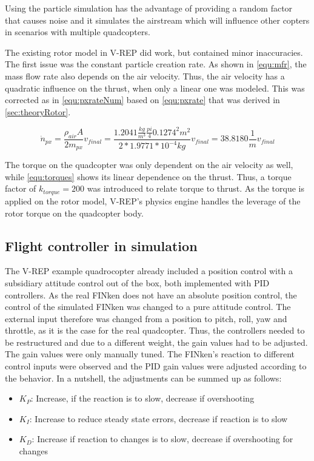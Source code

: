 Using the particle simulation has the advantage of providing a  random factor that causes noise and it simulates the airstream which will influence other copters in scenarios with multiple quadcopters.

The existing rotor model in V-REP did work, but contained minor inaccuracies. 
The first issue was the constant particle creation rate. As shown in \ref{equ:mfr}, the mass flow rate also depends on the air velocity. Thus, the air velocity has a quadratic influence on the thrust, when only a linear one was modeled. 
This was corrected as in \ref{equ:pxrateNum} based on  \ref{equ:pxrate} that was derived in \ref{sec:theoryRotor}.

  \begin{equation}
    \dot n_{px} = \frac{\rho_{air} A}{2m_{px}} v_{final} = \frac{1.2041 \frac{kg}{m^3} \frac{pi}{4} 0.1274^2 m^2}{2 * 1.9771 * 10^{-4} kg} v_{final} = 38.8180 \frac{1}{m}v_{final}
    \label{equ:pxrateNum}
    \end{equation}
    
   The torque on the quadcopter was only dependent on the air velocity as well, while \ref{equ:torques} shows its linear dependence on the thrust. Thus, a torque factor of $k_{torque} = 200$ was introduced to relate torque to thrust. 
   As the torque is applied on the rotor model, V-REP's physics engine handles the leverage of the rotor torque on the quadcopter body.





\subsection{Flight controller in simulation}

The V-REP example quadrocopter already included a position control with a subsidiary attitude control out of the box, both implemented with \gls{PID} controllers.
As the real FINken does not have an absolute position control, the control of the simulated FINken was changed to a pure attitude control.
The external input therefore was changed from a position to pitch, roll, yaw and throttle, as it is the case for the real quadcopter.
Thus, the controllers needed to be restructured and due to a different weight, the gain values had to be adjusted.
The gain values were only manually tuned. 
The FINken's reaction to different control inputs were observed and the \gls{PID} gain values were adjusted according to the behavior.
In a nutshell, the adjustments can be summed up as follows:
\begin{itemize}
	\item{$K_P$: Increase, if the reaction is to slow, decrease if overshooting}
	\item{$K_I$: Increase to reduce steady state errors, decrease if reaction is to slow}
	\item{$K_D$: Increase if reaction to changes is to slow, decrease if overshooting for changes}
\end{itemize}

